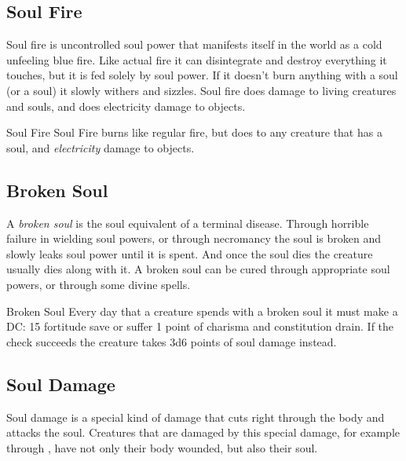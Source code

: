 \subsection{Soul Fire}
\label{sec:Soul Fire}

Soul fire is uncontrolled soul power that manifests itself in the world as a
cold unfeeling blue fire. Like actual fire it can disintegrate and destroy
everything it touches, but it is fed solely by soul power. If it doesn't burn
anything with a soul (or a soul) it slowly withers and sizzles. Soul fire does
damage to living creatures and souls, and does electricity damage to objects.

\begin{35e}{Soul Fire}
  Soul Fire burns like regular fire, but does  to any
  creature that has a soul, and \emph{electricity} damage to objects.
\end{35e}

\subsection{Broken Soul}
\label{sec:Broken Soul}


A \emph{broken soul} is the soul equivalent of a terminal disease. Through
horrible failure in wielding soul powers, or through necromancy the soul is
broken and slowly leaks soul power until it is spent. And once the soul dies
the creature usually dies along with it. A broken soul can be cured through
appropriate soul powers, or through some divine spells.

\begin{35e}{Broken Soul}
  Every day that a creature spends with a broken soul it must make a DC: 15
  fortitude save or suffer 1 point of charisma and constitution drain. If
  the check succeeds the creature takes 3d6 points of soul damage instead.
\end{35e}

\subsection{Soul Damage}
\label{sec:Soul Damage}

Soul damage is a special kind of damage that cuts right through the body and
attacks the soul. Creatures that are damaged by this special damage, for
example through , have not only their body wounded,
but also their soul.

